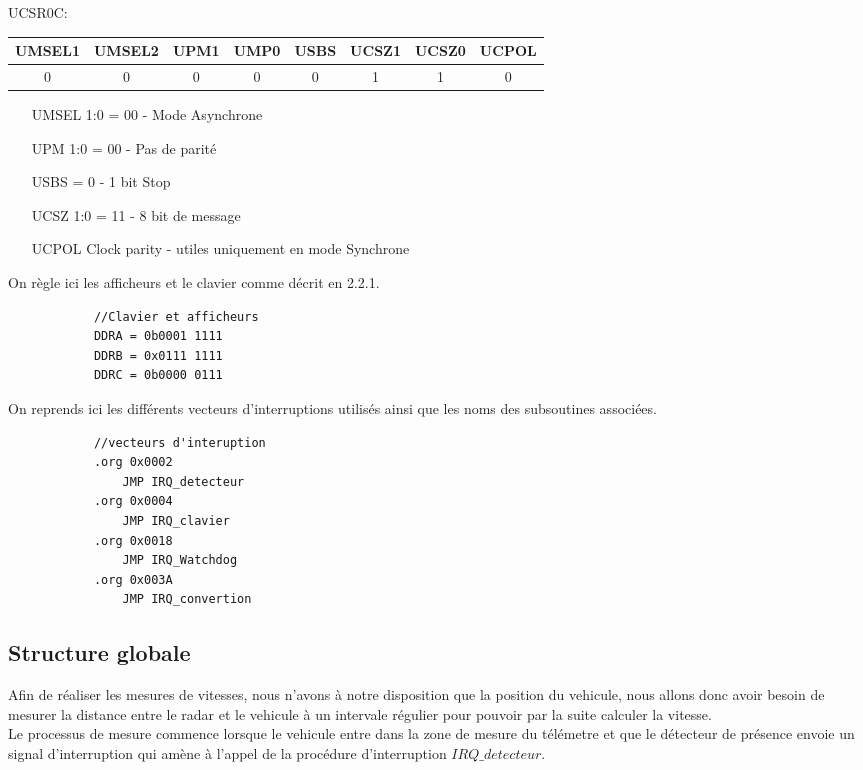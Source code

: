 \documentclass[a4paper, 12pt]{article}
\begin{document}
		UCSR0C:
		\begin{center}
			\begin{tabular}{|c|c|c|c|c|c|c|c|}
				\hline
				UMSEL1 & UMSEL2 & UPM1 & UMP0 & USBS & UCSZ1 & UCSZ0 & UCPOL\\
				\hline
				0 & 0 & 0 & 0 & 0 & 1 & 1 & 0\\
				\hline
			\end{tabular}
		\end{center}
		\begin{itemize}
			\item[UMSEL 1:0] = 00 - Mode Asynchrone
			\item[UPM 1:0] = 00 - Pas de parité
			\item[USBS] = 0 - 1 bit Stop
			\item[UCSZ 1:0] = 11 - 8 bit de message
			\item[UCPOL] Clock parity - utiles uniquement en mode Synchrone
		\end{itemize}
	
		On règle ici les afficheurs et le clavier comme décrit en 2.2.1.
		\begin{lstlisting}
			//Clavier et afficheurs
			DDRA = 0b0001 1111
			DDRB = 0x0111 1111
			DDRC = 0b0000 0111
		\end{lstlisting}

		On reprends ici les différents vecteurs d'interruptions utilisés ainsi que les noms des subsoutines associées.
		\begin{lstlisting}
			//vecteurs d'interuption
			.org 0x0002
				JMP IRQ_detecteur
			.org 0x0004
				JMP IRQ_clavier
			.org 0x0018
				JMP IRQ_Watchdog
			.org 0x003A
				JMP IRQ_convertion
		\end{lstlisting}
		\subsection{Structure globale}
		Afin de réaliser les mesures de vitesses, nous n'avons à notre disposition que la position du vehicule, nous allons donc avoir besoin de mesurer la distance entre le radar et le vehicule à un intervale régulier pour pouvoir par la suite calculer la vitesse. \\
		Le processus de mesure commence lorsque le vehicule entre dans la zone de mesure du télémetre et que le détecteur de présence envoie un signal d'interruption qui amène à l'appel de la procédure d'interruption $IRQ\_detecteur$.
		
\end{document}
